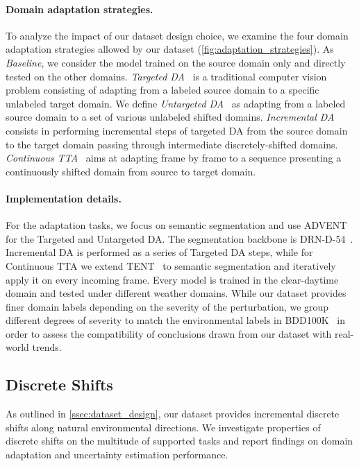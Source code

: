 \paragraph{Domain adaptation strategies.} \label{ssec:adaptation_strategies}
To analyze the impact of our dataset design choice, we examine the four domain adaptation strategies allowed by our dataset (\autoref{fig:adaptation_strategies}).
As \textit{Baseline}, we consider the model trained on the source domain only and directly tested on the other domains.
\textit{Targeted DA}~\cite{wang2018deep} is a traditional computer vision problem consisting of adapting from a labeled source domain to a specific unlabeled target domain.
We define \textit{Untargeted DA}~\cite{li2017deeper,segu2020batch} as adapting from a labeled source domain to a set of various unlabeled shifted domains. 
\textit{Incremental DA}~\cite{volpi2021continual}  consists in performing incremental steps of targeted DA from the source domain to the target domain passing through intermediate discretely-shifted domains.
\textit{Continuous TTA}~\cite{wang2020tent} aims at adapting frame by frame to a sequence presenting a continuously shifted domain from source to target domain.

\paragraph{Implementation details.} For the adaptation tasks, we focus on semantic segmentation and use ADVENT~\cite{vu2019advent} for the Targeted and Untargeted DA. 
The segmentation backbone is DRN-D-54~\cite{Yu2017}.
Incremental DA is performed as a series of Targeted DA steps, while for Continuous TTA we extend TENT~\cite{wang2020tent} to semantic segmentation and iteratively apply it on every incoming frame. Every model is trained in the clear-daytime domain and tested under different weather domains. While our dataset provides finer domain labels depending on the severity of the perturbation, we group different degrees of severity to match the environmental labels in BDD100K~\cite{bdd100k} in order to assess the compatibility of conclusions drawn from our dataset with real-world trends. 

\subsection{Discrete Shifts} \label{ssec:exp_discrete}
As outlined in \autoref{ssec:dataset_design}, our dataset provides incremental discrete shifts along natural environmental directions.
We investigate properties of discrete shifts on the multitude of supported tasks and report findings on domain adaptation and uncertainty estimation performance.

